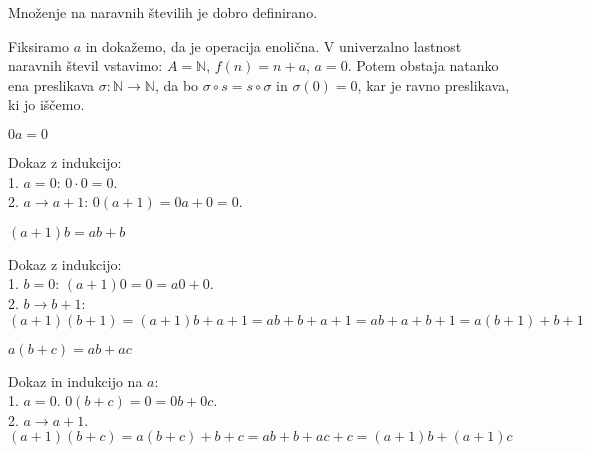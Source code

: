 \begin{trditev}
    Množenje na naravnih številih je dobro definirano.
\end{trditev}
\begin{dokaz}
    Fiksiramo $a$ in dokažemo, da je operacija enolična.
    V univerzalno lastnost naravnih števil vstavimo: $A = \mathbb{N}$, $f(n) = n + a$, $a = 0$.
    Potem obstaja natanko ena preslikava $\sigma: \mathbb{N} \to \mathbb{N}$, da bo $\sigma \circ s = s \circ \sigma$ in $\sigma(0) = 0$,
    kar je ravno preslikava, ki jo iščemo.
\end{dokaz}

\begin{trditev}
    $0a = 0$
\end{trditev}
\begin{dokaz}
    Dokaz z indukcijo: \\
    1. $a = 0$: $0\cdot 0 = 0$. \\
    2. $a \to a + 1$: $0(a+1) = 0a + 0 = 0$.
\end{dokaz}

\begin{trditev}
    $(a + 1)b = ab + b$
\end{trditev}
\begin{dokaz}
    Dokaz z indukcijo: \\
    1. $b = 0$: $(a + 1)0 = 0 = a0 + 0$. \\
    2. $b \to b + 1$: $(a + 1)(b + 1) = (a + 1)b + a + 1 = ab + b + a + 1 = ab + a + b + 1 = a(b + 1) + b + 1$
\end{dokaz}

\begin{trditev}
    $a(b + c) = ab + ac$
\end{trditev}
\begin{dokaz}
    Dokaz in indukcijo na $a$: \\
    1. $a = 0$. $0(b + c) = 0 = 0b + 0c$. \\
    2. $a \to a + 1$. $(a + 1)(b + c) = a(b + c) + b + c = ab + b + ac + c = (a + 1)b + (a + 1)c$
\end{dokaz}

